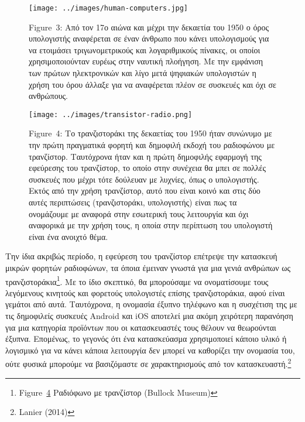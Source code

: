 \documentclass[
]{article}
\begin{document}
\leavevmode{}%
\begin{figure}
\hypertarget{fig:human-computers}{%
\centering
\texttt{[image: ../images/human-computers.jpg]}
\caption{Figure~3: Από τον 17ο αιώνα και μέχρι την δεκαετία του 1950 ο
όρος υπολογιστής αναφέρεται σε έναν άνθρωπο που κάνει υπολογισμούς για
να ετοιμάσει τριγωνομετρικούς και λογαριθμικούς πίνακες, οι οποίοι
χρησιμοποιούνταν ευρέως στην ναυτική πλοήγηση. Με την εμφάνιση των
πρώτων ηλεκτρονικών και λίγο μετά ψηφιακών υπολογιστών η χρήση του όρου
άλλαξε για να αναφέρεται πλέον σε συσκευές και όχι σε
ανθρώπους.}\label{fig:human-computers}
}
\end{figure}

\leavevmode{}%
\begin{figure}
\hypertarget{fig:transistor-radio}{%
\centering
\texttt{[image: ../images/transistor-radio.png]}
\caption{Figure~4: Το τρανζιστοράκι της δεκαετίας του 1950 ήταν συνώνυμο
με την πρώτη πραγματικά φορητή και δημοφιλή εκδοχή του ραδιοφώνου με
τρανζίστορ. Ταυτόχρονα ήταν και η πρώτη δημοφιλής εφαρμογή της εφεύρεσης
του τρανζίστορ, το οποίο στην συνέχεια θα μπει σε πολλές συσκευές που
μέχρι τότε δούλευαν με λυχνίες, όπως ο υπολογιστής. Εκτός από την χρήση
τρανζίστορ, αυτό που είναι κοινό και στις δύο αυτές περιπτώσεις
(τρανζιστοράκι, υπολογιστής) είναι πως τα ονομάζουμε με αναφορά στην
εσωτερική τους λειτουργία και όχι αναφορικά με την χρήση τους, η οποία
στην περίπτωση του υπολογιστή είναι ένα ανοιχτό
θέμα.}\label{fig:transistor-radio}
}
\end{figure}

Την ίδια ακριβώς περίοδο, η εφεύρεση του τρανζίστορ επέτρεψε την
κατασκευή μικρών φορητών ραδιοφώνων, τα όποια έμειναν γνωστά για μια
γενιά ανθρώπων ως τρανζιστοράκια\footnote{Figure~\protect\hyperlink{fig:transistor-radio}{4}
  Ραδιόφωνο με τρανζίστορ (Bullock Museum)}. Με το ίδιο σκεπτικό, θα
μπορούσαμε να ονοματίσουμε τους λεγόμενους κινητούς και φορετούς
υπολογιστές επίσης τρανζιστοράκια, αφού είναι γεμάτοι από αυτά.
Ταυτόχρονα, η ονομασία έξυπνο τηλέφωνο και η συσχέτιση της με τις
δημοφιλείς συσκευές Android και iOS αποτελεί μια ακόμη χειρότερη
παρανόηση για μια κατηγορία προϊόντων που οι κατασκευαστές τους θέλουν
να θεωρούνται έξυπνα. Επομένως, το γεγονός ότι ένα κατασκεύασμα
χρησιμοποιεί κάποιο υλικό ή λογισμικό για να κάνει κάποια λειτουργία δεν
μπορεί να καθορίζει την ονομασία του, ούτε φυσικά μπορούμε να
βασιζόμαστε σε χαρακτηρισμούς από τον κατασκευαστή.\footnote{Lanier
  (2014)}
\end{document}
